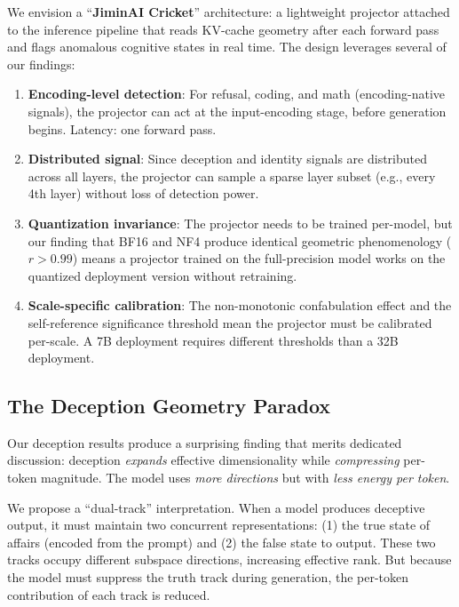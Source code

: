 \documentclass[11pt,a4paper]{article}
\begin{document}
We envision a ``\textbf{JiminAI Cricket}'' architecture: a lightweight projector attached to the inference pipeline that reads KV-cache geometry after each forward pass and flags anomalous cognitive states in real time. The design leverages several of our findings:

\begin{enumerate}[leftmargin=*]
    \item \textbf{Encoding-level detection}: For refusal, coding, and math (encoding-native signals), the projector can act at the input-encoding stage, before generation begins. Latency: one forward pass.

    \item \textbf{Distributed signal}: Since deception and identity signals are distributed across all layers, the projector can sample a sparse layer subset (e.g., every 4th layer) without loss of detection power.

    \item \textbf{Quantization invariance}: The projector needs to be trained per-model, but our finding that BF16 and NF4 produce identical geometric phenomenology ($r > 0.99$) means a projector trained on the full-precision model works on the quantized deployment version without retraining.

    \item \textbf{Scale-specific calibration}: The non-monotonic confabulation effect and the self-reference significance threshold mean the projector must be calibrated per-scale. A 7B deployment requires different thresholds than a 32B deployment.
\end{enumerate}

\subsection{The Deception Geometry Paradox}

Our deception results produce a surprising finding that merits dedicated discussion: deception \emph{expands} effective dimensionality while \emph{compressing} per-token magnitude. The model uses \emph{more directions} but with \emph{less energy per token}.

We propose a ``dual-track'' interpretation. When a model produces deceptive output, it must maintain two concurrent representations: (1) the true state of affairs (encoded from the prompt) and (2) the false state to output. These two tracks occupy different subspace directions, increasing effective rank. But because the model must suppress the truth track during generation, the per-token contribution of each track is reduced.
\end{document}
